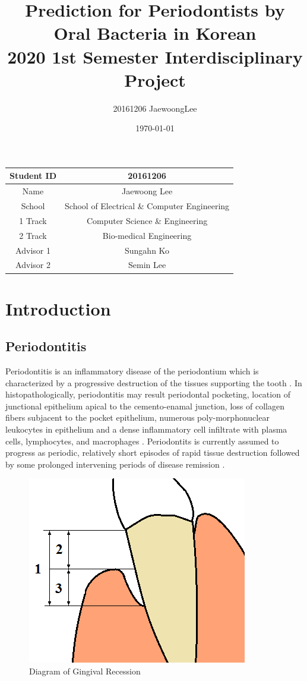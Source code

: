 \documentclass[aps, 11pt, a4paper]{article}
\title{Prediction for Periodontists by Oral Bacteria in Korean\\ \large 2020 1st Semester Interdisciplinary Project}
\author{20161206 JaewoongLee}
\date{\today}
\begin{document}
    \maketitle
    \begin{table}[h]
    	\centering
		\begin{tabular}{c|c}
			Student ID & 20161206 \\ \hline
			Name & Jaewoong Lee \\ \hline
			School & School of Electrical \& Computer Engineering \\ \hline
			1 Track & Computer Science \& Engineering \\ \hline
			2 Track & Bio-medical Engineering \\ \hline
			Advisor 1 & Sungahn Ko \\ \hline
			Advisor 2 & Semin Lee \\
		\end{tabular}
    \end{table}
    \newpage
    
    \tableofcontents
    \listoftables
    \listoffigures
    \newpage
    
    \section{Introduction}
    	\subsection{Periodontitis}
    		Periodontitis is an inflammatory disease of the periodontium which is characterized by a progressive destruction of the tissues supporting the tooth \cite{ref:perio2}. In histopathologically, periodontitis may result periodontal pocketing, location of junctional epithelium apical to the cemento-enamal junction, loss of collagen fibers subjacent to the pocket epithelium, numerous poly-morphonuclear leukocytes in epithelium and a dense inflammatory cell infiltrate with plasma cells, lymphocytes, and macrophages \cite{ref:perio1}. Periodontits is currently assumed to progress as periodic, relatively short episodes of rapid tissue destruction followed by some prolonged intervening periods of disease remission \cite{ref:perio2}. 
    		
    		\begin{figure}[htbp]
    			\centering
    			\includegraphics[width=0.3 \linewidth]{figures/recession.png}
    			\caption{Diagram of Gingival Recession \protect \cite{ref:depth1}}
    			\label{fig:depth}
    		\end{figure}
    	
\end{document}
